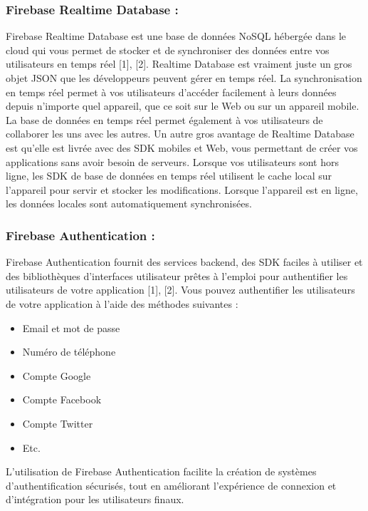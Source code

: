 \subsubsection{Firebase Realtime Database :}
 Firebase Realtime Database est une base de données NoSQL hébergée dans le cloud qui vous
permet de stocker et de synchroniser des données entre vos utilisateurs en temps réel [1], [2].
Realtime Database est vraiment juste un gros objet JSON que les développeurs peuvent gérer
en temps réel.
La synchronisation en temps réel permet à vos utilisateurs d'accéder facilement à leurs données
depuis n'importe quel appareil, que ce soit sur le Web ou sur un appareil mobile. La base de
données en temps réel permet également à vos utilisateurs de collaborer les uns avec les autres.
Un autre gros avantage de Realtime Database est qu'elle est livrée avec des SDK mobiles et
Web, vous permettant de créer vos applications sans avoir besoin de serveurs. Lorsque vos
utilisateurs sont hors ligne, les SDK de base de données en temps réel utilisent le cache local
sur l'appareil pour servir et stocker les modifications. Lorsque l'appareil est en ligne, les données
locales sont automatiquement synchronisées.
\subsubsection{Firebase Authentication :}
Firebase Authentication fournit des services backend, des SDK faciles à utiliser et des
bibliothèques d'interfaces utilisateur prêtes à l'emploi pour authentifier les utilisateurs de votre
application [1], [2].
Vous pouvez authentifier les utilisateurs de votre application à l'aide des méthodes suivantes :
\begin{itemize}[label=$\ast$]
	\item Email et mot de passe
	\item Numéro de téléphone
	\item Compte Google
	\item Compte Facebook
	\item Compte Twitter
	\item Etc.
\end{itemize}
L'utilisation de Firebase Authentication facilite la création de systèmes d'authentification
sécurisés, tout en améliorant l'expérience de connexion et d'intégration pour les utilisateurs
finaux.
